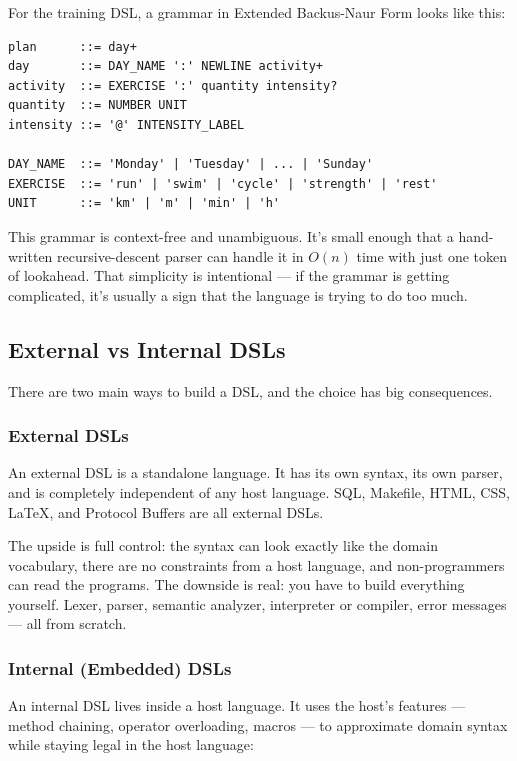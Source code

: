 For the training DSL, a grammar in Extended Backus-Naur Form looks like this:

\begin{lstlisting}
plan      ::= day+
day       ::= DAY_NAME ':' NEWLINE activity+
activity  ::= EXERCISE ':' quantity intensity?
quantity  ::= NUMBER UNIT
intensity ::= '@' INTENSITY_LABEL

DAY_NAME  ::= 'Monday' | 'Tuesday' | ... | 'Sunday'
EXERCISE  ::= 'run' | 'swim' | 'cycle' | 'strength' | 'rest'
UNIT      ::= 'km' | 'm' | 'min' | 'h'
\end{lstlisting}

This grammar is context-free and unambiguous. It's small enough that a hand-written
recursive-descent parser can handle it in $O(n)$ time with just one token of lookahead.
That simplicity is intentional --- if the grammar is getting complicated, it's usually a
sign that the language is trying to do too much.

\subsection{External vs Internal DSLs}

There are two main ways to build a DSL, and the choice has big consequences.

\subsubsection{External DSLs}

An external DSL is a standalone language. It has its own syntax, its own parser, and is
completely independent of any host language. SQL, Makefile, HTML, CSS, \LaTeX{}, and
Protocol Buffers are all external DSLs.

The upside is full control: the syntax can look exactly like the domain vocabulary, there
are no constraints from a host language, and non-programmers can read the programs.
The downside is real: you have to build everything yourself. Lexer, parser, semantic
analyzer, interpreter or compiler, error messages --- all from scratch.

\subsubsection{Internal (Embedded) DSLs}

An internal DSL lives inside a host language. It uses the host's features --- method
chaining, operator overloading, macros --- to approximate domain syntax while staying
legal in the host language:

